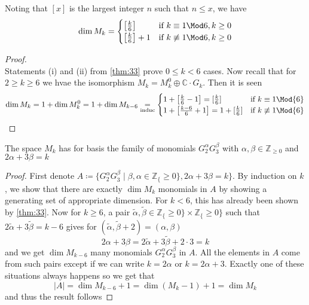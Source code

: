 \documentclass[12pt]{article}
\theoremstyle{definition}
\begin{document}
\begin{cor}
Noting that \([x]\) is the largest integer \(n\) such that \(n\leq  x\), we have  
\[
    \dim M_k = \begin{cases}
        \left[\frac{k}{6}\right] & \text{if } k \equiv 1 \Mod 6, k\geq 0\\
        \left[\frac{k}{6}\right]+1 & \text{if } k \not\equiv 1 \Mod 6, k\geq 0\\
    \end{cases}
\]
\end{cor}
\begin{proof}~\\
Statements (i) and (ii) from \cref{thm:33} prove \(0\leq k<6\) cases. Now recall that for \(2\geq k\geq 6\) we hvae the isomorphism \(M_k = M_k^0 \oplus \mathbb{C} \cdot G_k\). Then it is seen 
\[
    \dim M_k = 1 + \dim M_k^0 = 1+ \dim M_{k-6} \underset{\textrm{induc}}{=} \begin{cases}
        1+ \left[ \frac{k}{6} - 1 \right] = [\frac{k}{6}] & \textrm{if } k \equiv 1 \Mod{6}\\
        1+ \left[ \frac{k-6}{6} +1 \right] = 1+[\frac{k}{6}] & \textrm{if } k \not\equiv 1 \Mod{6}
    \end{cases}
\]   
\end{proof}
\begin{cor}
The space \(M_k\) has for basis the family of monomials \(G_2^\alpha G_3^\beta \) with \(\alpha ,\beta \in \mathbb{Z} _{\geq 0}\) and \(2\alpha +3\beta =k\)   
\end{cor}
\begin{proof}
First denote \(A\coloneqq \{ G_2^\alpha G_3^\beta \mid \beta ,\alpha \in \mathbb{Z}_\{ \geq 0 \}, 2\alpha +3\beta =k  \} \). By induction on \(k\), we show that there are exactly \(\dim M_k\) monomials in \(A\) by showing a generating set of appropriate dimension. For \(k<6\), this has already been shown by \cref{thm:33}. Now for \(k\geq 6\), a pair \(\widetilde{\alpha },\widetilde{\beta }\in \mathbb{Z}_\{ \geq 0 \}\times \mathbb{Z}_\{ \geq 0 \}  \) such that \(2\widetilde{\alpha }+3\widetilde{\beta }=k-6  \) gives for \((\widetilde{\alpha }, \widetilde{\beta } +2 ) = (\alpha ,\beta )\) 
\[
    2\alpha +3\beta =2 \widetilde{\alpha }+3 \widetilde{\beta }+2\cdot 3=k  
\]          
and we get \(\dim M_{k-6}\) many monomials \(G_2^\alpha G_3^\beta \) in \(A\).
All the elements in \(A\) come from such pairs except if we can write \(k=2\alpha \) or \(k=2\alpha +3\). Exactly one of these situations always happens so we get that \[\vert A \vert =\dim M_{k-6}+1=\dim (M_k-1)+1=\dim M_k\]  
and thus the result follows    
\end{proof}
\end{document}
